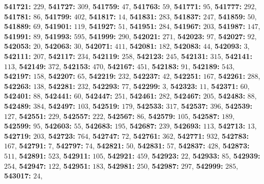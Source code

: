 \textsf{\bfseries 541721:} $229$, \textsf{\bfseries 541727:} $309$, \textsf{\bfseries 541759:} $47$, \textsf{\bfseries 541763:} $59$, \textsf{\bfseries 541771:} $95$, \textsf{\bfseries 541777:} $292$, \textsf{\bfseries 541781:} $86$, \textsf{\bfseries 541799:} $402$, \textsf{\bfseries 541817:} $14$, \textsf{\bfseries 541831:} $283$, \textsf{\bfseries 541837:} $247$, \textsf{\bfseries 541859:} $50$, \textsf{\bfseries 541889:} $69$, \textsf{\bfseries 541901:} $119$, \textsf{\bfseries 541927:} $51$, \textsf{\bfseries 541951:} $284$, \textsf{\bfseries 541967:} $203$, \textsf{\bfseries 541987:} $147$, \textsf{\bfseries 541991:} $89$, \textsf{\bfseries 541993:} $595$, \textsf{\bfseries 541999:} $290$, \textsf{\bfseries 542021:} $271$, \textsf{\bfseries 542023:} $97$, \textsf{\bfseries 542027:} $92$, \textsf{\bfseries 542053:} $20$, \textsf{\bfseries 542063:} $30$, \textsf{\bfseries 542071:} $411$, \textsf{\bfseries 542081:} $182$, \textsf{\bfseries 542083:} $44$, \textsf{\bfseries 542093:} $3$, \textsf{\bfseries 542111:} $207$, \textsf{\bfseries 542117:} $234$, \textsf{\bfseries 542119:} $258$, \textsf{\bfseries 542123:} $245$, \textsf{\bfseries 542131:} $315$, \textsf{\bfseries 542141:} $113$, \textsf{\bfseries 542149:} $372$, \textsf{\bfseries 542153:} $470$, \textsf{\bfseries 542167:} $451$, \textsf{\bfseries 542183:} $91$, \textsf{\bfseries 542189:} $543$, \textsf{\bfseries 542197:} $158$, \textsf{\bfseries 542207:} $65$, \textsf{\bfseries 542219:} $232$, \textsf{\bfseries 542237:} $42$, \textsf{\bfseries 542251:} $167$, \textsf{\bfseries 542261:} $288$, \textsf{\bfseries 542263:} $138$, \textsf{\bfseries 542281:} $232$, \textsf{\bfseries 542293:} $77$, \textsf{\bfseries 542299:} $3$, \textsf{\bfseries 542323:} $11$, \textsf{\bfseries 542371:} $60$, \textsf{\bfseries 542401:} $88$, \textsf{\bfseries 542441:} $60$, \textsf{\bfseries 542447:} $251$, \textsf{\bfseries 542461:} $282$, \textsf{\bfseries 542467:} $205$, \textsf{\bfseries 542483:} $88$, \textsf{\bfseries 542489:} $384$, \textsf{\bfseries 542497:} $103$, \textsf{\bfseries 542519:} $179$, \textsf{\bfseries 542533:} $317$, \textsf{\bfseries 542537:} $396$, \textsf{\bfseries 542539:} $127$, \textsf{\bfseries 542551:} $229$, \textsf{\bfseries 542557:} $222$, \textsf{\bfseries 542567:} $86$, \textsf{\bfseries 542579:} $105$, \textsf{\bfseries 542587:} $189$, \textsf{\bfseries 542599:} $95$, \textsf{\bfseries 542603:} $55$, \textsf{\bfseries 542683:} $195$, \textsf{\bfseries 542687:} $239$, \textsf{\bfseries 542693:} $113$, \textsf{\bfseries 542713:} $13$, \textsf{\bfseries 542719:} $203$, \textsf{\bfseries 542723:} $764$, \textsf{\bfseries 542747:} $72$, \textsf{\bfseries 542761:} $362$, \textsf{\bfseries 542771:} $932$, \textsf{\bfseries 542783:} $167$, \textsf{\bfseries 542791:} $7$, \textsf{\bfseries 542797:} $74$, \textsf{\bfseries 542821:} $50$, \textsf{\bfseries 542831:} $57$, \textsf{\bfseries 542837:} $428$, \textsf{\bfseries 542873:} $511$, \textsf{\bfseries 542891:} $523$, \textsf{\bfseries 542911:} $105$, \textsf{\bfseries 542921:} $459$, \textsf{\bfseries 542923:} $22$, \textsf{\bfseries 542933:} $85$, \textsf{\bfseries 542939:} $254$, \textsf{\bfseries 542947:} $122$, \textsf{\bfseries 542951:} $183$, \textsf{\bfseries 542981:} $250$, \textsf{\bfseries 542987:} $297$, \textsf{\bfseries 542999:} $285$, \textsf{\bfseries 543017:} $24$, 
